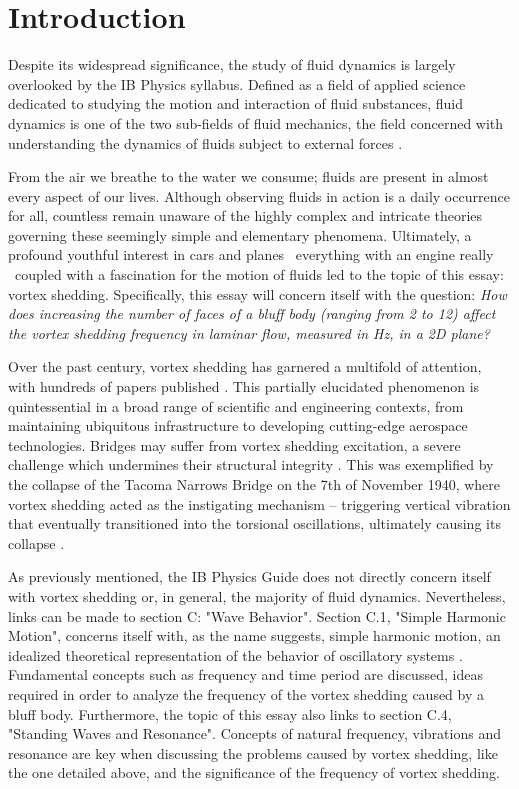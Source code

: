 \section{Introduction}

Despite its widespread significance, the study of fluid dynamics is largely overlooked by the IB Physics syllabus. Defined as a field of applied science dedicated to studying the motion and interaction of fluid substances, fluid dynamics is one of the two sub-fields of fluid mechanics, the field concerned with understanding the dynamics of fluids subject to external forces \parencite{livescience_fluid_dynamics}. 

From the air we breathe to the water we consume; fluids are present in almost every aspect of our lives. Although observing fluids in action is a daily occurrence for all, countless remain unaware of the highly complex and intricate theories governing these seemingly simple and elementary phenomena. Ultimately, a profound youthful interest in cars and planes \textemdash\ everything with an engine really \textemdash\ coupled with a fascination for the motion of fluids led to the topic of this essay: vortex shedding. Specifically, this essay will concern itself with the question: \textit{How does increasing the number of faces of a bluff body (ranging from 2 to 12) affect the vortex shedding frequency in laminar flow, measured in Hz, in a 2D plane?}

Over the past century, vortex shedding has garnered a multifold of attention, with hundreds of papers published \parencite[61]{buresti1998}. This partially elucidated phenomenon is quintessential in a broad range of scientific and engineering contexts, from maintaining ubiquitous infrastructure to developing cutting-edge aerospace technologies. Bridges may suffer from vortex shedding excitation, a severe challenge which undermines their structural integrity \parencite[1040]{jurado2012}. This was exemplified by the collapse of the Tacoma Narrows Bridge on the 7th of November 1940, where vortex shedding acted as the instigating mechanism -- triggering vertical vibration that eventually transitioned into the torsional oscillations, ultimately causing its collapse \parencite{tacoma_bridge_vibrations}.

As previously mentioned, the IB Physics Guide \parencite{ib_physics_2025} does not directly concern itself with vortex shedding or, in general, the majority of fluid dynamics. Nevertheless, links can be made to section C: "Wave Behavior". Section C.1, "Simple Harmonic Motion", concerns itself with, as the name suggests, simple harmonic motion, an idealized theoretical representation of the behavior of oscillatory systems \parencite[313]{allum2023}. Fundamental concepts such as frequency and time period are discussed, ideas required in order to analyze the frequency of the vortex shedding caused by a bluff body. Furthermore, the topic of this essay also links to section C.4, "Standing Waves and Resonance". Concepts of natural frequency, vibrations and resonance are key when discussing the problems caused by vortex shedding, like the one detailed above, and the significance of the frequency of vortex shedding. 





